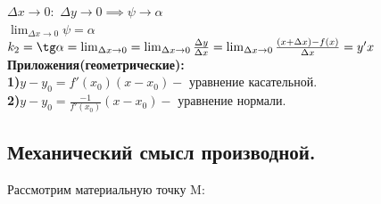 \documentclass[12pt, a4paper]{article}
\theoremstyle{remark}
\begin{document}
	$\Delta x \to 0:$ $\Delta y \to 0 \implies \psi \to \alpha$ \\
	
	$\lim_{\Delta x \to 0} \psi = \alpha$ \\
	
	$k_2 = \tg \alpha = \lim_{\Delta x \to 0} = \lim_{\Delta x \to 0} \frac{\Delta y}{\Delta x} = \lim_{\Delta x \to 0} \frac{(x + \Delta x) - f(x)}{\Delta x} = y'x$ \\
	
	\textbf{Приложения(геометрические):} \\
	
	\textbf{1)}$y - y_0 = f'(x_0)(x - x_0) -$ уравнение касательной. \\
	
	\textbf{2)}$y - y_0 = \frac{-1}{f'(x_0)} (x - x_0) -$ уравнение нормали. \\
	
	\newpage
	
	\subsection{Механический смысл производной.}
	
	Рассмотрим материальную точку M: \\
	
\end{document}
